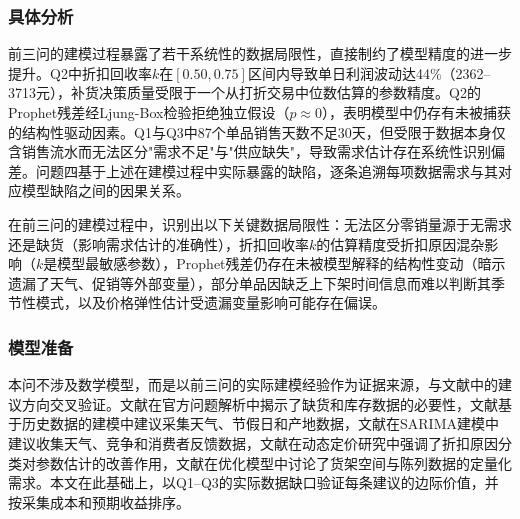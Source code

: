 
\subsubsection{具体分析}

前三问的建模过程暴露了若干系统性的数据局限性，直接制约了模型精度的进一步提升。Q2中折扣回收率$k$在$[0.50,0.75]$区间内导致单日利润波动达44\%（2362--3713元），补货决策质量受限于一个从打折交易中位数估算的参数精度。Q2的Prophet残差经Ljung-Box检验拒绝独立假设（$p\approx 0$），表明模型中仍存有未被捕获的结构性驱动因素。Q1与Q3中87个单品销售天数不足30天，但受限于数据本身仅含销售流水而无法区分"需求不足"与"供应缺失"，导致需求估计存在系统性识别偏差。问题四基于上述在建模过程中实际暴露的缺陷，逐条追溯每项数据需求与其对应模型缺陷之间的因果关系。

在前三问的建模过程中，识别出以下关键数据局限性：无法区分零销量源于无需求还是缺货（影响需求估计的准确性），折扣回收率$k$的估算精度受折扣原因混杂影响（$k$是模型最敏感参数），Prophet残差仍存在未被模型解释的结构性变动（暗示遗漏了天气、促销等外部变量），部分单品因缺乏上下架时间信息而难以判断其季节性模式，以及价格弹性估计受遗漏变量影响可能存在偏误。

\subsubsection{模型准备}

本问不涉及数学模型，而是以前三问的实际建模经验作为证据来源，与文献中的建议方向交叉验证。文献\cite{Wu2024}在官方问题解析中揭示了缺货和库存数据的必要性，文献\cite{Cao2024}基于历史数据的建模中建议采集天气、节假日和产地数据，文献\cite{Chen2024}在SARIMA建模中建议收集天气、竞争和消费者反馈数据，文献\cite{Gao2024}在动态定价研究中强调了折扣原因分类对参数估计的改善作用，文献\cite{Su2025}在优化模型中讨论了货架空间与陈列数据的定量化需求。本文在此基础上，以Q1--Q3的实际数据缺口验证每条建议的边际价值，并按采集成本和预期收益排序。
